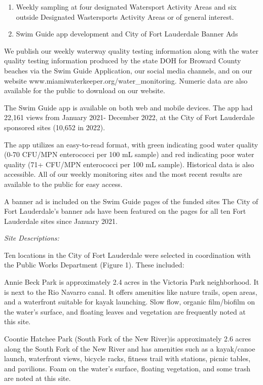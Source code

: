 \documentclass[
]{article}
\begin{document}
\begin{enumerate}
\def\labelenumi{\arabic{enumi}.}
\item
  Weekly sampling at four designated Watersport Activity Areas and six
  outside Designated Wastersports Activity Areas or of general interest.
\item
  Swim Guide app development and City of Fort Lauderdale Banner Ads
\end{enumerate}

We publish our weekly waterway quality testing information along with
the water quality testing information produced by the state DOH for
Broward County beaches via the Swim Guide Application, our social media
channels, and on our website www.miamiwaterkeeper.org/water\_monitoring.
Numeric data are also available for the public to download on our
website.

The Swim Guide app is available on both web and mobile devices. The app
had 22,161 views from January 2021- December 2022, at the City of Fort
Lauderdale sponsored sites (10,652 in 2022).

The app utilizes an easy-to-read format, with green indicating good
water quality (0-70 CFU/MPN enterococci per 100 mL sample) and red
indicating poor water quality (71+ CFU/MPN enterococci per 100 mL
sample). Historical data is also accessible. All of our weekly
monitoring sites and the most recent results are available to the public
for easy access.

A banner ad is included on the Swim Guide pages of the funded sites The
City of Fort Lauderdale's banner ads have been featured on the pages for
all ten Fort Lauderdale sites since January 2021.

\emph{Site Descriptions:}

Ten locations in the City of Fort Lauderdale were selected in
coordination with the Public Works Department (Figure 1). These
included:

Annie Beck Park is approximately 2.4 acres in the Victoria Park
neighborhood. It is next to the Rio Navarro canal. It offers amenities
like nature trails, open areas, and a waterfront suitable for kayak
launching. Slow flow, organic film/biofilm on the water's surface, and
floating leaves and vegetation are frequently noted at this site.

Coontie Hatchee Park (South Fork of the New River)is approximately 2.6
acres along the South Fork of the New River and has amenities such as a
kayak/canoe launch, waterfront views, bicycle racks, fitness trail with
stations, picnic tables, and pavilions. Foam on the water's surface,
floating vegetation, and some trash are noted at this site.
\end{document}
